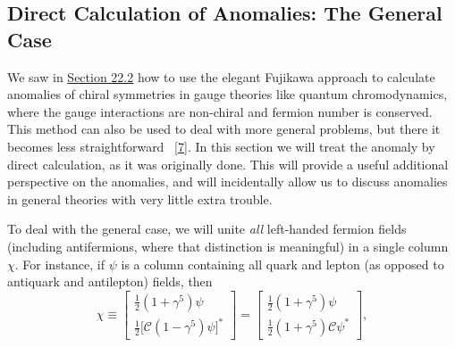 \subsection{Direct Calculation of Anomalies: The General Case}
\label{sec:22.3}

We saw in \hyperref[sec:22.2]{Section 22.2} how to use the elegant Fujikawa
approach to calculate anomalies of chiral symmetries in gauge theories like
quantum chromodynamics, where the gauge interactions are non-chiral and
fermion number is conserved. This method can also be used to deal with more
general problems, but there it becomes less straightforward~%
\hyperref[ch22-ref-7]{[7]}. In this section we will treat the anomaly by
direct calculation, as it was originally done. This will provide a useful
additional perspective on the anomalies, and will incidentally allow us to
discuss anomalies in general theories with very little extra trouble.

To deal with the general case, we will unite \emph{all} left-handed fermion
fields (including antifermions, where that distinction is meaningful) in a
single column $\chi$. For instance, if $\psi$ is a column containing all
quark and lepton (as opposed to antiquark and antilepton) fields, then
\begin{equation}
 \chi\equiv
 \begin{bmatrix}
  \tfrac12(1+\gamma^5)\psi\\[2pt]
  \tfrac12\bigl[\mathcal C(1-\gamma^5)\psi\bigr]^*
 \end{bmatrix}
 =
 \begin{bmatrix}
  \tfrac12(1+\gamma^5)\psi\\[2pt]
  \tfrac12(1+\gamma^5)\mathcal C\psi^*
 \end{bmatrix},
 \tag{22.3.1}\label{eq:22.3.1}
\end{equation}

